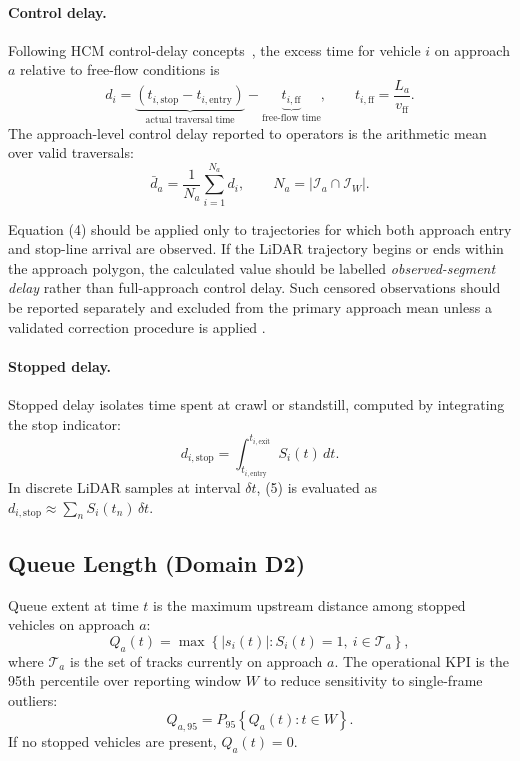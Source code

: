 \documentclass[11pt]{article}
\begin{document}
\paragraph{Control delay.} Following HCM control-delay concepts~\cite{hcm}, the excess time for vehicle $i$ on approach $a$ relative to free-flow conditions is
\begin{equation}
 d_i=
 \underbrace{\left(t_{i,\mathrm{stop}}-t_{i,\mathrm{entry}}\right)}_{\text{actual traversal time}}
 -\underbrace{t_{i,\mathrm{ff}}}_{\text{free-flow time}},
 \qquad
 t_{i,\mathrm{ff}}=\frac{L_a}{v_{\mathrm{ff}}}.
\end{equation}
The approach-level control delay reported to operators is the arithmetic mean over valid traversals:
\begin{equation}
 \bar d_a=\frac{1}{N_a}\sum_{i=1}^{N_a}d_i,
 \qquad
 N_a=\lvert\mathcal{I}_a\cap\mathcal{I}_W\rvert.
\end{equation}

Equation (4) should be applied only to trajectories for which both approach
entry and stop-line arrival are observed. If the LiDAR trajectory begins or
ends within the approach polygon, the calculated value should be labelled
\emph{observed-segment delay} rather than full-approach control delay. Such
censored observations should be reported separately and excluded from the
primary approach mean unless a validated correction procedure is applied
\cite{wang2024state}.

\paragraph{Stopped delay.} Stopped delay isolates time spent at crawl or standstill, computed by integrating the stop indicator:
\begin{equation}
 d_{i,\mathrm{stop}}=\int_{t_{i,\mathrm{entry}}}^{t_{i,\mathrm{exit}}}S_i(t)\,dt.
\end{equation}
In discrete LiDAR samples at interval $\delta t$, (5) is evaluated as $d_{i,\mathrm{stop}}\approx\sum_n S_i(t_n)\,\delta t$.

\subsection{Queue Length (Domain D2)}

Queue extent at time $t$ is the maximum upstream distance among stopped vehicles on approach $a$:
\begin{equation}
 Q_a(t)=\max\left\{\lvert s_i(t)\rvert:S_i(t)=1,\ i\in\mathcal{T}_a\right\},
\end{equation}
where $\mathcal{T}_a$ is the set of tracks currently on approach $a$. The operational KPI is the 95th percentile over reporting window $W$ to reduce sensitivity to single-frame outliers:
\begin{equation}
 Q_{a,95}=P_{95}\left\{Q_a(t):t\in W\right\}.
\end{equation}
If no stopped vehicles are present, $Q_a(t)=0$.
\end{document}

